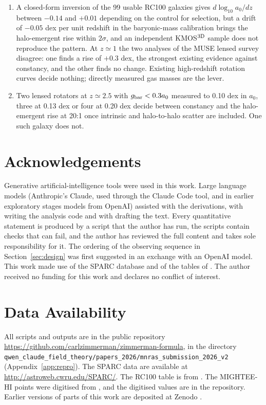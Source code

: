 \documentclass[fleqn,usenatbib]{mnras}
\begin{document}
\begin{enumerate}
\item A closed-form inversion of the 99 usable RC100 galaxies gives $d\log_{10}a_0/dz$ between $-0.14$ and $+0.01$ depending on the control for selection, but a drift of $-0.05$ dex per unit redshift in the baryonic-mass calibration brings the halo-emergent rise within $2\sigma$, and an independent KMOS$^{\rm 3D}$ sample does not reproduce the pattern. At $z\simeq1$ the two analyses of the MUSE lensed survey disagree: one finds a rise of $+0.3$ dex, the strongest existing evidence against constancy, and the other finds no change. Existing high-redshift rotation curves decide nothing; directly measured gas masses are the lever.
\item Two lensed rotators at $z\simeq2.5$ with $g_{\rm bar}<0.3a_0$ measured to 0.10 dex in $a_0$, three at 0.13 dex or four at 0.20 dex decide between constancy and the halo-emergent rise at 20:1 once intrinsic and halo-to-halo scatter are included. One such galaxy does not.
\end{enumerate}

\section*{Acknowledgements}
Generative artificial-intelligence tools were used in this work. Large language models (Anthropic's Claude, used through the Claude Code tool, and in earlier exploratory stages models from OpenAI) assisted with the derivations, with writing the analysis code and with drafting the text. Every quantitative statement is produced by a script that the author has run, the scripts contain checks that can fail, and the author has reviewed the full content and takes sole responsibility for it. The ordering of the observing sequence in Section~\ref{sec:design} was first suggested in an exchange with an OpenAI model. This work made use of the SPARC database \citep{Lelli2016} and of the tables of \citet{NestorShachar2023}. The author received no funding for this work and declares no conflict of interest.

\section*{Data Availability}
All scripts and outputs are in the public repository \url{https://github.com/carlzimmerman/zimmerman-formula}, in the directory \nolinkurl{qwen_claude_field_theory/papers_2026/mnras_submission_2026_v2} (Appendix~\ref{app:repro}). The SPARC data are available at \url{http://astroweb.cwru.edu/SPARC/}. The RC100 table is from \citet{NestorShachar2023}. The MIGHTEE-HI points were digitised from \citet{Varasteanu2025}, and the digitised values are in the repository. Earlier versions of parts of this work are deposited at Zenodo \citep{Zimmerman2026kappa,Zimmerman2026a0z}.
\end{document}
